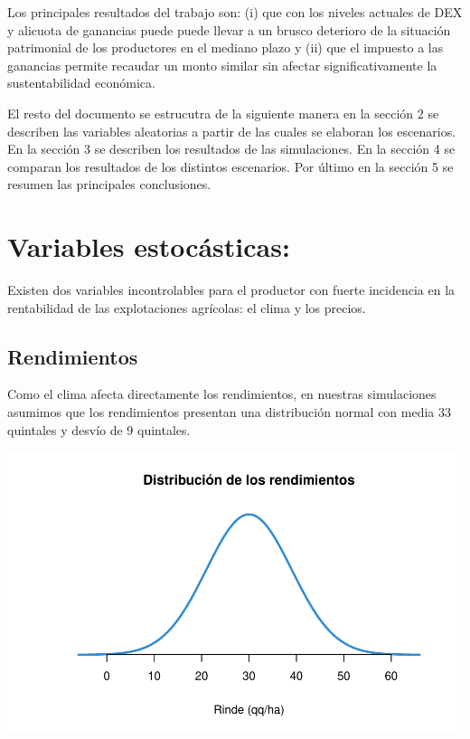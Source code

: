 \documentclass[
  12pt,
  spanish,
  10pt]{article}
\begin{document}
Los principales resultados del trabajo son: (i) que con los niveles
actuales de DEX y alicuota de ganancias puede puede llevar a un brusco
deterioro de la situación patrimonial de los productores en el mediano
plazo y (ii) que el impuesto a las ganancias permite recaudar un monto
similar sin afectar significativamente la sustentabilidad económica.

El resto del documento se estrucutra de la siguiente manera en la
sección 2 se describen las variables aleatorias a partir de las cuales
se elaboran los escenarios. En la sección 3 se describen los resultados
de las simulaciones. En la sección 4 se comparan los resultados de los
distintos escenarios. Por último en la sección 5 se resumen las
principales conclusiones.

\hypertarget{variables-estocuxe1sticas}{%
\section{Variables estocásticas:}\label{variables-estocuxe1sticas}}

Existen dos variables incontrolables para el productor con fuerte
incidencia en la rentabilidad de las explotaciones agrícolas: el clima y
los precios.

\hypertarget{rendimientos}{%
\subsection{Rendimientos}\label{rendimientos}}

Como el clima afecta directamente los rendimientos, en nuestras
simulaciones asumimos que los rendimientos presentan una distribución
normal con media 33 quintales y desvío de 9 quintales.

\includegraphics{simulacion_retenciones_files/figure-latex/unnamed-chunk-2-1.pdf}
\end{document}
